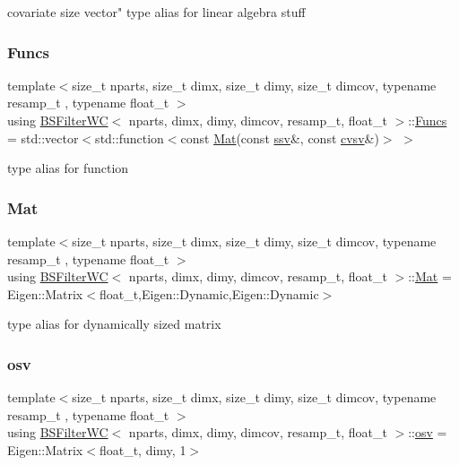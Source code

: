 covariate size vector" type alias for linear algebra stuff \mbox{\label{classBSFilterWC_a984a5a75eef118f2f4db7f8953fea653}} 
\subsubsection{\texorpdfstring{Funcs}{Funcs}}
{\footnotesize\ttfamily template$<$size\+\_\+t nparts, size\+\_\+t dimx, size\+\_\+t dimy, size\+\_\+t dimcov, typename resamp\+\_\+t , typename float\+\_\+t $>$ \\
using \hyperlink{classBSFilterWC}{B\+S\+Filter\+WC}$<$ nparts, dimx, dimy, dimcov, resamp\+\_\+t, float\+\_\+t $>$\+::\hyperlink{classBSFilterWC_a984a5a75eef118f2f4db7f8953fea653}{Funcs} =  std\+::vector$<$std\+::function$<$const \hyperlink{classBSFilterWC_a507a06203a27e3a025a43be68b4b0e0e}{Mat}(const \hyperlink{classBSFilterWC_afff292a8cc15505cc3aa244135203c78}{ssv}\&, const \hyperlink{classBSFilterWC_a52f5a46901a821fffe82937543220a1a}{cvsv}\&)$>$ $>$}

type alias for function \mbox{\label{classBSFilterWC_a507a06203a27e3a025a43be68b4b0e0e}} 
\subsubsection{\texorpdfstring{Mat}{Mat}}
{\footnotesize\ttfamily template$<$size\+\_\+t nparts, size\+\_\+t dimx, size\+\_\+t dimy, size\+\_\+t dimcov, typename resamp\+\_\+t , typename float\+\_\+t $>$ \\
using \hyperlink{classBSFilterWC}{B\+S\+Filter\+WC}$<$ nparts, dimx, dimy, dimcov, resamp\+\_\+t, float\+\_\+t $>$\+::\hyperlink{classBSFilterWC_a507a06203a27e3a025a43be68b4b0e0e}{Mat} =  Eigen\+::\+Matrix$<$float\+\_\+t,Eigen\+::\+Dynamic,Eigen\+::\+Dynamic$>$}

type alias for dynamically sized matrix \mbox{\label{classBSFilterWC_a48b0c7f1a1cf7e57300cf820e74057ce}} 
\subsubsection{\texorpdfstring{osv}{osv}}
{\footnotesize\ttfamily template$<$size\+\_\+t nparts, size\+\_\+t dimx, size\+\_\+t dimy, size\+\_\+t dimcov, typename resamp\+\_\+t , typename float\+\_\+t $>$ \\
using \hyperlink{classBSFilterWC}{B\+S\+Filter\+WC}$<$ nparts, dimx, dimy, dimcov, resamp\+\_\+t, float\+\_\+t $>$\+::\hyperlink{classBSFilterWC_a48b0c7f1a1cf7e57300cf820e74057ce}{osv} =  Eigen\+::\+Matrix$<$float\+\_\+t, dimy, 1$>$}

